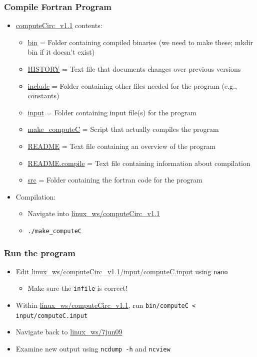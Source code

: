 \documentclass[hyperref,pdfa,unicode,utf8,usepdftitle]{beamer}
\begin{document}
\begin{frame}
  \frametitle{Compile Fortran Program}
  \begin{itemize}
  \item \url{computeCirc_v1.1} contents:
    \begin{itemize}
    \item \url{bin} = Folder containing compiled binaries (we need to
      make these; mkdir bin if it doesn’t exist)
    \item \url{HISTORY} = Text file that documents changes over
      previous versions
    \item \url{include} = Folder containing other files needed for the
      program (e.g., constants)
    \item \url{input} = Folder containing input file(s) for the
      program
    \item \url{make_computeC} = Script that actually compiles the
      program
    \item \url{README} = Text file containing an overview of the
      program
    \item \url{README.compile} = Text file containing information
      about compilation
    \item \url{src} = Folder containing the fortran code for the
      program
    \end{itemize}
  \item Compilation:
    \begin{itemize}
    \item Navigate into \url{linux_ws/computeCirc_v1.1}
    \item \lstinline{./make_computeC}
    \end{itemize}
  \end{itemize}
\end{frame}

\begin{frame}
  \frametitle{Run the program}
  \begin{itemize}
  \item Edit \url{linux_ws/computeCirc_v1.1/input/computeC.input}
    using \lstinline{nano}
    \begin{itemize}
    \item Make sure the \texttt{infile} is correct!
    \end{itemize}
  \item Within \url{linux_ws/computeCirc_v1.1},
    run \lstinline{bin/computeC < input/computeC.input}
  \item Navigate back to \url{linux_ws/7jun09}
  \item Examine new output using \lstinline{ncdump -h} and \lstinline{ncview}
  \end{itemize}
\end{frame}
\end{document}
